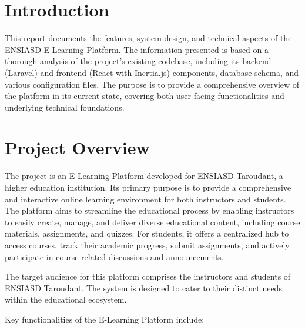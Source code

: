\section*{Introduction}

This report documents the features, system design, and technical aspects of the ENSIASD E-Learning Platform. The information presented is based on a thorough analysis of the project's existing codebase, including its backend (Laravel) and frontend (React with Inertia.js) components, database schema, and various configuration files. The purpose is to provide a comprehensive overview of the platform in its current state, covering both user-facing functionalities and underlying technical foundations.

\section*{Project Overview}

The project is an E-Learning Platform developed for ENSIASD Taroudant, a higher education institution. Its primary purpose is to provide a comprehensive and interactive online learning environment for both instructors and students. The platform aims to streamline the educational process by enabling instructors to easily create, manage, and deliver diverse educational content, including course materials, assignments, and quizzes. For students, it offers a centralized hub to access courses, track their academic progress, submit assignments, and actively participate in course-related discussions and announcements.

The target audience for this platform comprises the instructors and students of ENSIASD Taroudant. The system is designed to cater to their distinct needs within the educational ecosystem.

Key functionalities of the E-Learning Platform include:

